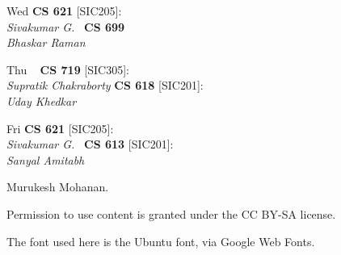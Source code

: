 \documentclass{article}
\begin{document}
				
					Wed
					\textbf{CS 621} [SIC205]: \\\emph{Sivakumar G.}~
					\textbf{CS 699}\\\emph{Bhaskar Raman}~
				
				
					Thu
					~
					\textbf{CS 719} [SIC305]: \\\emph{Supratik Chakraborty}
					\textbf{CS 618} [SIC201]: \\\emph{Uday Khedkar}~
				
				
					Fri
					\textbf{CS 621} [SIC205]: \\\emph{Sivakumar G.}~
					\textbf{CS 613} [SIC201]: \\\emph{Sanyal Amitabh}~
					~
			
			
		
		
			 Murukesh Mohanan.
			 \par Permission to use content is granted under the CC BY-SA license.
			 \par The font used here is the Ubuntu font, via Google Web Fonts.
		 
\end{document}
